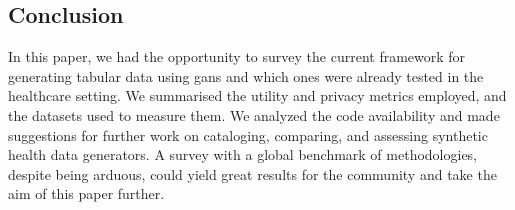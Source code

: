 \subsection{Conclusion}
In this paper, we had the opportunity to survey the current framework for generating tabular data using \acp{gan} and which ones were already tested in the healthcare setting. We summarised the utility and privacy metrics employed, and the datasets used to measure them. We analyzed the code availability and made suggestions for further work on cataloging, comparing, and assessing synthetic health data generators. A survey with a global benchmark of methodologies, despite being arduous, could yield great results for the community and take the aim of this paper further.